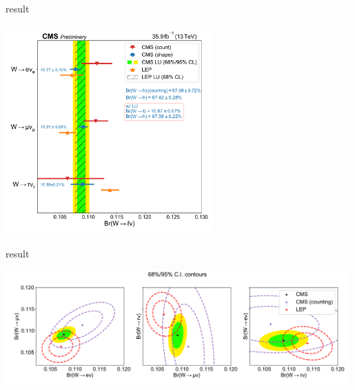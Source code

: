 \begin{frame}{result}
    \begin{center}
    \includegraphics[width=0.6\textwidth]{chapters/Analysis/sectionResult/figures/unblinded_summary_plot.pdf}
    \end{center}
\end{frame}


\begin{frame}{result}
    \begin{center}
    \includegraphics[width=0.99\textwidth]{chapters/Analysis/sectionResult/figures/result_contours_2d.pdf}
    \end{center}
\end{frame}


